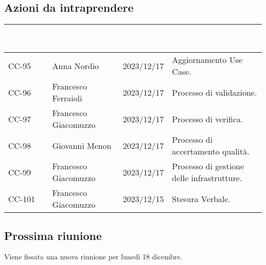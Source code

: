 \subsection{Azioni da intraprendere}
{
    \setlength{\tabcolsep}{10pt}
            \renewcommand{\arraystretch}{1.5}
            \begin{tabularx}{\textwidth}{| l | X | l | X |}
                 \hline
                 \rowcolor{headerrow}\textbf{\textcolor{white}{Codice issue}} & \textbf{\textcolor{white}{Assegnatario}} & \textbf{\textcolor{white}{Scadenza}} & \textbf{\textcolor{white}{Descrizione}} \\
                 \hline
                 CC-95 & Anna Nordio & 2023/12/17 & Aggiornamento Use Case. \\
                 \hline
                 CC-96 & Francesco Ferraioli & 2023/12/17 &  Processo di validazione.\\
                 \hline
                 CC-97 & Francesco Giacomuzzo & 2023/12/17 & Processo di verifica.  \\
                 \hline
                 CC-98 & Giovanni Menon & 2023/12/17 & Processo di accertamento qualità.\\
                 \hline
                 CC-99 & Francesco Giacomuzzo & 2023/12/17 & Processo di gestione delle infrastrutture. \\
                 \hline
                 CC-101 &Francesco Giacomuzzo & 2023/12/15 & Stesura Verbale.  \\
                 \hline
            \end{tabularx}
}


\subsection{Prossima riunione} \label{subsec:riunione}
Viene fissata una nuova riunione per lunedì 18 dicembre.
